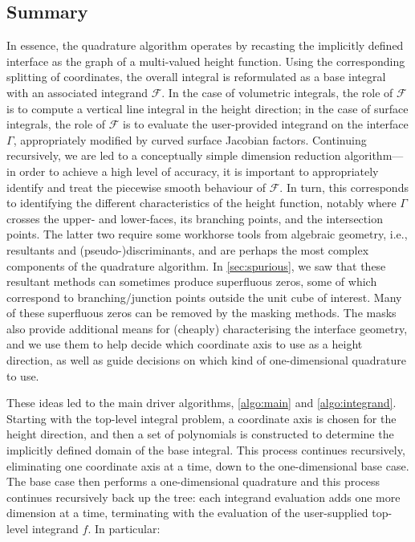 \documentclass[onefignum,onetabnum,onealgnum,oneeqnum]{siamart190516}
\begin{document}
\subsection{Summary} %

In essence, the quadrature algorithm operates by recasting the implicitly defined interface as the graph of a multi-valued height function. Using the corresponding splitting of coordinates, the overall integral is reformulated as a base integral with an associated integrand ${\mathcal F}$. In the case of volumetric integrals, the role of ${\mathcal F}$ is to compute a vertical line integral in the height direction; in the case of surface integrals, the role of ${\mathcal F}$ is to evaluate the user-provided integrand on the interface $\Gamma$, appropriately modified by curved surface Jacobian factors. Continuing recursively, we are led to a conceptually simple dimension reduction algorithm---in order to achieve a high level of accuracy, it is important to appropriately identify and treat the piecewise smooth behaviour of ${\mathcal F}$. In turn, this corresponds to identifying the different characteristics of the height function, notably where $\Gamma$ crosses the upper- and lower-faces, its branching points, and the intersection points. The latter two require some workhorse tools from algebraic geometry, i.e., resultants and (pseudo-)discriminants, and are perhaps the most complex components of the quadrature algorithm. In \cref{sec:spurious}, we saw that these resultant methods can sometimes produce superfluous zeros, some of which correspond to branching/junction points outside the unit cube of interest. Many of these superfluous zeros can be removed by the masking methods. The masks also provide additional means for (cheaply) characterising the interface geometry, and we use them to help decide which coordinate axis to use as a height direction, as well as guide decisions on which kind of one-dimensional quadrature to use.

These ideas led to the main driver algorithms, \cref{algo:main} and \cref{algo:integrand}. Starting with the top-level integral problem, a coordinate axis is chosen for the height direction, and then a set of polynomials is constructed to determine the implicitly defined domain of the base integral. This process continues recursively, eliminating one coordinate axis at a time, down to the one-dimensional base case. The base case then performs a one-dimensional quadrature and this process continues recursively back up the tree: each integrand evaluation adds one more dimension at a time, terminating with the evaluation of the user-supplied top-level integrand $f$. %
In particular:
\end{document}
